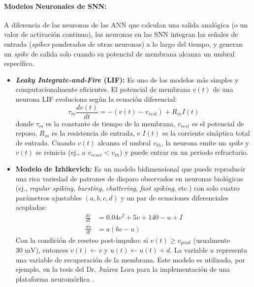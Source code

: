 \documentclass[12pt]{article}
\begin{document}
\paragraph{Modelos Neuronales de SNN:}
A diferencia de las neuronas de las ANN que calculan una salida analógica (o un valor de activación continuo), las neuronas en las SNN integran las señales de entrada (\textit{spikes} ponderados de otras neuronas) a lo largo del tiempo, y generan un \textit{spike} de salida solo cuando su potencial de membrana alcanza un umbral específico.
\begin{itemize}
    \item \textbf{\textit{Leaky Integrate-and-Fire} (LIF):} Es uno de los modelos más simples y computacionalmente eficientes. El potencial de membrana $v(t)$ de una neurona LIF evoluciona según la ecuación diferencial:
    \begin{equation}
    \tau_m \frac{dv(t)}{dt} = - (v(t) - v_{rest}) + R_{in} I(t)
    \label{eq:lif_model_exp}
    \end{equation}
    donde $\tau_m$ es la constante de tiempo de la membrana, $v_{rest}$ es el potencial de reposo, $R_{in}$ es la resistencia de entrada, e $I(t)$ es la corriente sináptica total de entrada. Cuando $v(t)$ alcanza el umbral $v_{th}$, la neurona emite un \textit{spike} y $v(t)$ se reinicia (ej., a $v_{reset} < v_{th}$) y puede entrar en un periodo refractario.
    \item \textbf{Modelo de Izhikevich:} Es un modelo bidimensional que puede reproducir una rica variedad de patrones de disparo observados en neuronas biológicas (ej., \textit{regular spiking}, \textit{bursting}, \textit{chattering}, \textit{fast spiking}, etc.) con solo cuatro parámetros ajustables $(a, b, c, d)$ y un par de ecuaciones diferenciales acopladas:
    \begin{align}
    \frac{dv}{dt} &= 0.04v^2 + 5v + 140 - u + I \label{eq:izhikevich_v} \\
    \frac{du}{dt} &= a(bv - u) \label{eq:izhikevich_u}
    \end{align}
    Con la condición de reseteo post-impulso: si $v(t) \ge v_{peak}$ (usualmente $30 \text{ mV}$), entonces $v(t) \leftarrow c$ y $u(t) \leftarrow u(t) + d$. La variable $u$ representa una variable de recuperación de la membrana. Este modelo es utilizado, por ejemplo, en la tesis del Dr. Juárez Lora para la implementación de una plataforma neuromórfica \cite{JuarezLora2024Thesis}.
\end{itemize}
\end{document}
